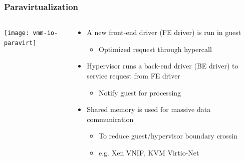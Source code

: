 \begin{frame}
	\frametitle{Paravirtualization}
	
	
	
	\begin{columns}
		
		\begin{column}{.4\textwidth}
			\centering
			\texttt{[image: vmm-io-paravirt]}
		\end{column}
		
		\begin{column}{.6\textwidth}
			\begin{itemize}
				\item A new front-end driver (FE driver) is run in guest
				\begin{itemize}
					\item Optimized request through hypercall
					
				\end{itemize} 
			
				\item Hypervisor runs a back-end driver (BE driver) to service request from FE driver
				\begin{itemize}
					\item Notify guest for processing
	
				\end{itemize} 			
			
			\item Shared memory is used for massive data communication
			\begin{itemize}
				\item To reduce guest/hypervisor boundary crossin
				\item e.g. Xen VNIF, KVM Virtio-Net
			\end{itemize} 
			
			\end{itemize} 	
			
			
		\end{column}
		
		
	\end{columns}
	
	
\end{frame}


